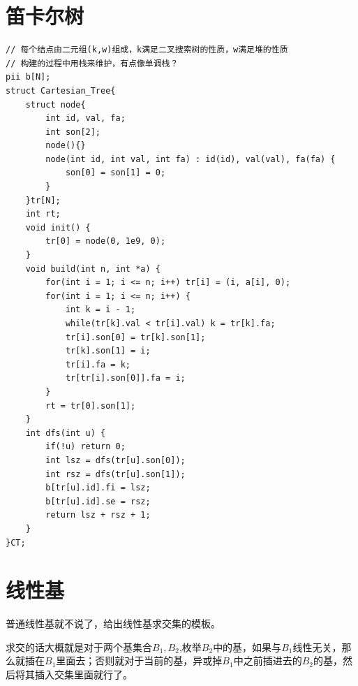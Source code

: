 \documentclass[a4paper,11pt,twoside,fontset = fandol,UTF8]{ctexbook} %
\begin{document}
	\section{笛卡尔树}
	\begin{lstlisting}
// 每个结点由二元组(k,w)组成，k满足二叉搜索树的性质，w满足堆的性质
// 构建的过程中用栈来维护，有点像单调栈？
pii b[N];
struct Cartesian_Tree{
    struct node{
        int id, val, fa;
        int son[2];
        node(){}
        node(int id, int val, int fa) : id(id), val(val), fa(fa) {
            son[0] = son[1] = 0;
        }
    }tr[N];
    int rt;
    void init() {
        tr[0] = node(0, 1e9, 0);
    }
    void build(int n, int *a) {
        for(int i = 1; i <= n; i++) tr[i] = (i, a[i], 0);
        for(int i = 1; i <= n; i++) {
            int k = i - 1;
            while(tr[k].val < tr[i].val) k = tr[k].fa;
            tr[i].son[0] = tr[k].son[1];
            tr[k].son[1] = i;
            tr[i].fa = k;
            tr[tr[i].son[0]].fa = i;
        }
        rt = tr[0].son[1];
    }
    int dfs(int u) {
        if(!u) return 0;
        int lsz = dfs(tr[u].son[0]);
        int rsz = dfs(tr[u].son[1]);
        b[tr[u].id].fi = lsz;
        b[tr[u].id].se = rsz;
        return lsz + rsz + 1;
    }
}CT; 

	\end{lstlisting}
	\section{线性基}
	普通线性基就不说了，给出线性基求交集的模板。
	
	求交的话大概就是对于两个基集合$B_1,B_2$,枚举$B_2$中的基，如果与$B_1$线性无关，那么就插在$B_1$里面去；否则就对于当前的基，异或掉$B_1$中之前插进去的$B_2$的基，然后将其插入交集里面就行了。
	
\end{document}
